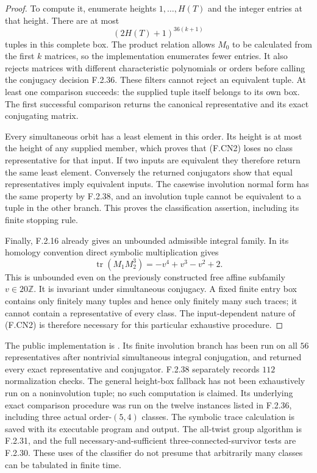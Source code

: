 \begin{proof}
To compute it, enumerate heights $1,\ldots,H(T)$ and the
integer entries at that height. There are at most
\[
                     (2H(T)+1)^{36(k+1)}                  \tag{F.CN2}
\]
tuples in this complete box. The product relation allows
$M_0$ to be calculated from the first $k$ matrices, so the
implementation enumerates fewer entries. It also rejects
matrices with different characteristic polynomials or orders
before calling the conjugacy decision F.2.36. These filters
cannot reject an equivalent tuple. At least one comparison
succeeds: the supplied tuple itself belongs to its own box.
The first successful comparison returns the canonical
representative and its exact conjugating matrix.

Every simultaneous orbit has a least element in this order.
Its height is at most the height of any supplied member,
which proves that (F.CN2) loses no class representative for
that input. If two inputs are equivalent they therefore
return the same least element. Conversely the returned
conjugators show that equal representatives imply equivalent
inputs. The casewise involution normal form has the same
property by F.2.38, and an involution tuple cannot be
equivalent to a tuple in the other branch. This proves the
classification assertion, including its finite stopping rule.

Finally, F.2.16 already gives an unbounded admissible integral
family. In its homology convention direct symbolic
multiplication gives
\[
             \operatorname{tr}(M_1M_2^3)
                       =-v^4+v^3-v^2+2.                 \tag{F.CN3}
\]
This is unbounded even on the previously constructed free
affine subfamily $v\in20\mathbb Z$. It is invariant under
simultaneous conjugacy. A fixed finite entry box contains
only finitely many tuples and hence only finitely many such
traces; it cannot contain a representative of every class.
The input-dependent nature of (F.CN2) is therefore necessary
for this particular exhaustive procedure.
\end{proof}

The public implementation is
.
Its finite involution branch has been run on all $56$
representatives after nontrivial simultaneous integral
conjugation, and returned every exact representative and
conjugator. F.2.38 separately records $112$ normalization
checks. The general height-box fallback has not been
exhaustively run on a noninvolution tuple; no such computation
is claimed. Its underlying exact comparison procedure was
run on the twelve instances listed in F.2.36, including
three actual order-$(5,4)$ classes. The symbolic trace
calculation is saved with its executable program and output.
The all-twist group algorithm is F.2.31, and the full
necessary-and-sufficient three-connected-survivor tests are
F.2.30. These uses of the classifier do not presume that
arbitrarily many classes can be tabulated in finite time.

